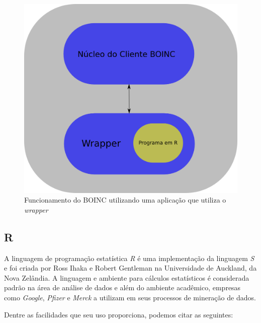 \begin{figure}[!h]
  \centering
  \includegraphics[scale=0.3]{boinc-wrap.png}
  \caption{Funcionamento do BOINC utilizando uma aplicação que utiliza o \emph{wrapper}}
  \label{boinc-wrap}
\end{figure}


\subsection{R}

A linguagem de programação estatística \emph{R} é uma implementação da linguagem \emph{S} e foi criada por Ross Ihaka e Robert
Gentleman na Universidade de Auckland, da Nova Zelândia. A linguagem e ambiente para cálculos estatísticos é considerada
padrão \cite{nytimes} %
na área de análise de dados e além do ambiente acadêmico, empresas como \emph{Google}, \emph{Pfizer} e \emph{Merck} a utilizam em seus
processos de mineração de dados. 

Dentre as facilidades que seu uso proporciona, podemos citar as seguintes:

